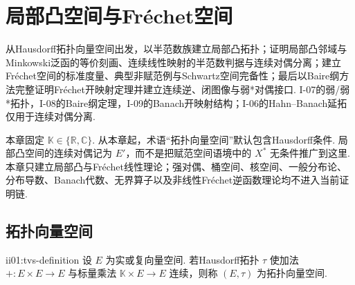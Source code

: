 \chapter{局部凸空间与Fr\'echet空间}\label{chap:II-01}
\FAChapterOpening
{从Hausdorff拓扑向量空间出发，以半范数族建立局部凸拓扑；证明局部凸邻域与Minkowski泛函的等价刻画、连续线性映射的半范数判据与连续对偶分离；建立Fr\'echet空间的标准度量、典型非赋范例与Schwartz空间完备性；最后以Baire纲方法完整证明Fr\'echet开映射定理并建立连续逆、闭图像与弱*对偶接口.}
{I-07的弱/弱*拓扑，I-08的Baire纲定理，I-09的Banach开映射结构；I-06的Hahn--Banach延拓仅用于连续对偶分离.}
{\begin{center}
\end{center}}

本章固定 \(\displaystyle \mathbb K\in\{\mathbb R,\mathbb C\}\). 从本章起，术语“拓扑向量空间”默认包含Hausdorff条件. 局部凸空间的连续对偶记为 \(\displaystyle E'\)，而不是把赋范空间语境中的 \(\displaystyle X^*\) 无条件推广到这里. 本章只建立局部凸与Fr\'echet线性理论；强对偶、桶空间、核空间、一般分布论、分布导数、Banach代数、无界算子以及非线性Fr\'echet逆函数理论均不进入当前证明链.

\section{拓扑向量空间}\label{sec:ii01-tvs}

\begin{FADefinition}[C][拓扑向量空间约定]{ii01:tvs-definition}
设 \(\displaystyle E\) 为实或复向量空间. 若Hausdorff拓扑 \(\displaystyle \tau\) 使加法 \(\displaystyle +:E\times E\to E\) 与标量乘法 \(\displaystyle \mathbb K\times E\to E\) 连续，则称 \(\displaystyle (E,\tau)\) 为拓扑向量空间.
\end{FADefinition}

